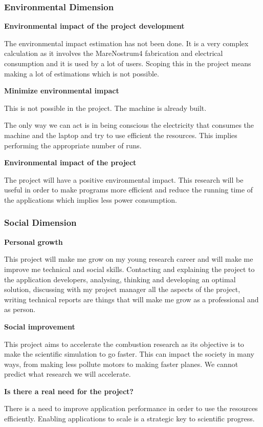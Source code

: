 \subsubsection{Environmental Dimension}

\textbf{Environmental impact of the project development}

The environmental impact estimation has not been done. It is a very complex calculation as it involves the MareNostrum4 fabrication and electrical consumption and it is used by a lot of users. Scoping this in the project means making a lot of estimations which is not possible.

\textbf{Minimize environmental impact}

This is not possible in the project. The machine is already built.

The only way we can act is in being conscious the electricity that consumes the machine and the laptop and try to use efficient the resources. This implies performing the appropriate number of runs.

\textbf{Environmental impact of the project}

The project will have a positive environmental impact. This research will be useful in order to make programs more efficient and reduce the running time of the applications which implies less power consumption.

\subsubsection{Social Dimension}

\textbf{Personal growth}

This project will make me grow on my young research career and will make me improve me technical and social skills. Contacting and explaining the project to the application developers, analysing, thinking and developing an optimal solution, discussing with my project manager all the aspects of the project, writing technical reports are things that will make me grow as a professional and as person.

\textbf{Social improvement}

This project aims to accelerate the combustion research as its objective is to make the scientific simulation to go faster. This can impact the society in many ways, from making less pollute motors to making faster planes. We cannot predict what research we will accelerate. 

\textbf{Is there a real need for the project?}

There is a need to improve application performance in order to use the resources efficiently. Enabling applications to scale is a strategic key to scientific progress.
